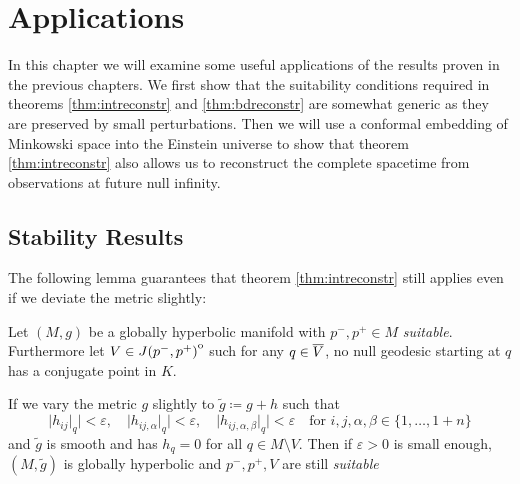 \chapter{Applications}\label{chap:applications}
In this chapter we will examine some useful applications of the results proven in the previous chapters. We first show that the suitability conditions required in theorems \ref{thm:intreconstr} and \ref{thm:bdreconstr} are somewhat generic as they are preserved by small perturbations. Then we will use a conformal embedding of Minkowski space into the Einstein universe to show that theorem \ref{thm:intreconstr} also allows us to reconstruct the complete spacetime from observations at future null infinity.

\section{Stability Results}
The following lemma guarantees that theorem \ref{thm:intreconstr} still applies even if we deviate the metric slightly:
\begin{lemma}
    Let $(M,g)$ be a globally hyperbolic manifold with $p^-,p^+\in M$ \emph{suitable}. Furthermore let $V\in {\kern0ptJ(p^-,p^+)}^{\mathrm{o}}$ such for any $q\in {\overline{V}}$, no null geodesic starting at $q$ has a conjugate point in $K$.

    If we vary the metric $g$ slightly to $\widetilde{g}\coloneqq g+h$ such that 
    \[
        \lvert h_{ij}\rvert_q \rvert <\varepsilon, \quad \lvert h_{ij,\alpha}\rvert_q \rvert <\varepsilon, \quad \lvert h_{ij,\alpha,\beta}\rvert_q \rvert <\varepsilon \quad \text{for }i,j,\alpha,\beta\in \{1,\dots, 1+n\}
    \]
    and $\widetilde{g}$ is smooth and has $h_q=0$ for all $q\in M\setminus V$. Then if $\varepsilon>0$ is small enough, $(M,\widetilde{g})$ is globally hyperbolic and $p^-,p^+,V$ are still \emph{suitable}
\end{lemma}
